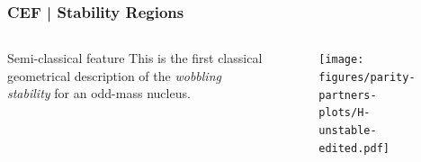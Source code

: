 \documentclass{beamer}
\begin{document}
\begin{frame}
	\frametitle{CEF | Stability Regions}
	\vspace{-0.5cm}
	\begin{columns}
		\begin{column}{0.45\textwidth}
			\begin{table}
				\centering
				\caption{The minimum points of $\mathcal{H}$. Using the MOIs from the fitting procedure}
			\end{table}		
			\begin{alertblock}{Semi-classical feature}
				This is the first classical geometrical description of the \emph{wobbling stability} for an odd-mass nucleus.
			\end{alertblock}
		\end{column}
		\begin{column}{0.55\textwidth}
			\begin{figure}
				\centering
				\texttt{[image: figures/parity-partners-plots/H-unstable-edited.pdf]}
			\end{figure}
		\end{column}
	\end{columns}
\end{frame}
\end{document}
